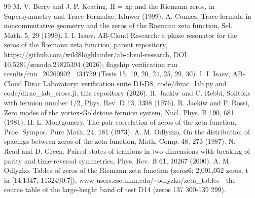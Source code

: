 \documentclass[11pt,a4paper]{article}
\begin{document}
\begin{thebibliography}{99}
 M. V. Berry and J. P. Keating, H = xp and the Riemann zeros, in Supersymmetry and Trace Formulae, Kluwer (1999).
 A. Connes, Trace formula in noncommutative geometry and the zeros of the Riemann zeta function, Sel. Math. 5, 29 (1999).
 I. I. Isaev, AB-Cloud Research: a phase resonator for the zeros of the Riemann zeta function, parent repository, https://github.com/wild8highlander/ab-cloud-research, DOI 10.5281/zenodo.21825394 (2026); flagship verification run results/run\_\allowbreak{}20260902\_\allowbreak{}134759 (Tests 15, 19, 20, 24, 25, 29, 30).
 I. I. Isaev, AB-Cloud Dirac Laboratory: verification suite D1-D8, code/dirac\_\allowbreak{}lab.py and code/dirac\_\allowbreak{}lab\_\allowbreak{}cross.jl, this repository (2026).
 R. Jackiw and C. Rebbi, Solitons with fermion number 1/2, Phys. Rev. D 13, 3398 (1976).
 R. Jackiw and P. Rossi, Zero modes of the vortex-Goldstone fermion system, Nucl. Phys. B 190, 681 (1981).
 H. L. Montgomery, The pair correlation of zeros of the zeta function, Proc. Sympos. Pure Math. 24, 181 (1973).
 A. M. Odlyzko, On the distribution of spacings between zeros of the zeta function, Math. Comp. 48, 273 (1987).
 N. Read and D. Green, Paired states of fermions in two dimensions with breaking of parity and time-reversal symmetries, Phys. Rev. B 61, 10267 (2000).
 A. M. Odlyzko, Tables of zeros of the Riemann zeta function (zeros6; 2,001,052 zeros, t in [14.1347, 1132490.7]), www-users.cse.umn.edu/\textasciitilde{}odlyzko/zeta\_\allowbreak{}tables - the source table of the large-height band of test D14 (zeros 137 300-139 299).
\end{thebibliography}
\end{document}
